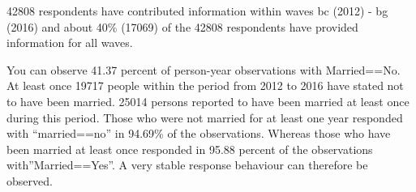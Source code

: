 \documentclass[letterpaper,10pt,openany,onesideH,english]{sphinxmanual}
\begin{document}
\begin{figure}[H]
\centering

\noindent{}
\end{figure}

42808 respondents have contributed information within waves bc (2012) - bg (2016) and about 40\% (17069) of the 42808 respondents have provided information for all waves.


%
\begin{sphinxVerbatim}[commandchars=\\\{\},numbers=left,firstnumber=1,stepnumber=1]
  
     
  
\end{sphinxVerbatim}

\begin{figure}[H]
\centering

\noindent{}
\end{figure}

You can observe 41.37 percent of person-year observations with Married==No. At least once 19717 people within the period from 2012 to 2016 have stated not to have been married. 25014 persons reported to have been married at least once during this period. Those who were not married for at least one year responded with “married==no” in 94.69\% of the observations. Whereas those who have been married at least once responded in 95.88 percent of the observations with”Married==Yes”. A very stable response behaviour can therefore be observed.

%
\begin{sphinxVerbatim}[commandchars=\\\{\},numbers=left,firstnumber=1,stepnumber=1]
  
  
\end{sphinxVerbatim}

\begin{figure}[H]
\centering

\noindent{}
\end{figure}
\end{document}
